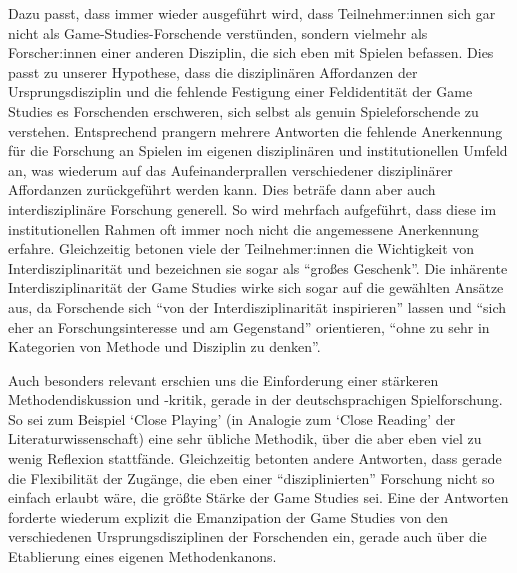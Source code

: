 \documentclass{scrartcl}
\begin{document}
Dazu passt, dass immer wieder ausgeführt wird, dass Teilnehmer:innen sich gar nicht als Game-Studies-Forschende verstünden, sondern vielmehr als Forscher:innen einer anderen Disziplin, die sich eben mit Spielen befassen.
Dies passt zu unserer Hypothese, dass die disziplinären Affordanzen der Ursprungsdisziplin und die fehlende Festigung einer Feldidentität der Game Studies es Forschenden erschweren, sich selbst als genuin Spieleforschende zu verstehen.
Entsprechend prangern mehrere Antworten die fehlende Anerkennung für die Forschung an Spielen im eigenen disziplinären und institutionellen Umfeld an, was wiederum auf das Aufeinanderprallen verschiedener disziplinärer Affordanzen zurückgeführt werden kann.
Dies beträfe dann aber auch interdisziplinäre Forschung generell.
So wird mehrfach aufgeführt, dass diese im institutionellen Rahmen oft immer noch nicht die angemessene Anerkennung erfahre.
Gleichzeitig betonen viele der Teilnehmer:innen die Wichtigkeit von Interdisziplinarität und bezeichnen sie sogar als \enquote{großes Geschenk}.
Die inhärente Interdisziplinarität der Game Studies wirke sich sogar auf die gewählten Ansätze aus, da Forschende sich \enquote{von der Interdisziplinarität inspirieren} lassen und \enquote{sich eher an Forschungsinteresse und am Gegenstand} orientieren, \enquote{ohne zu sehr in Kategorien von Methode und Disziplin zu denken}.

Auch besonders relevant erschien uns die Einforderung einer stärkeren Methodendiskussion und -kritik, gerade in der deutschsprachigen Spielforschung.
So sei zum Beispiel \enquote*{Close Playing} (in Analogie zum \enquote*{Close Reading} der Literaturwissenschaft) eine sehr übliche Methodik, über die aber eben viel zu wenig Reflexion stattfände.
Gleichzeitig betonten andere Antworten, dass gerade die Flexibilität der Zugänge, die eben einer \enquote{disziplinierten} Forschung nicht so einfach erlaubt wäre, die größte Stärke der Game Studies sei.
Eine der Antworten forderte wiederum explizit die Emanzipation der Game Studies von den verschiedenen Ursprungsdisziplinen der Forschenden ein, gerade auch über die Etablierung eines eigenen Methodenkanons.
\end{document}
